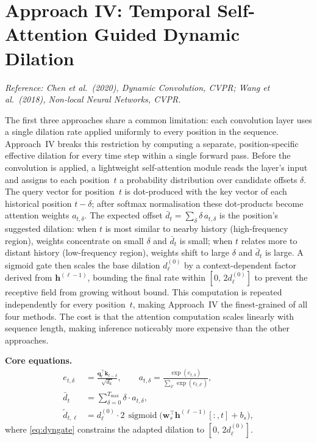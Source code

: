 \documentclass[12pt,a4paper]{article}
\DeclareMathOperator{\sigmoid}{sigmoid}
\newcommand{\hv}{\mathbf{h}}
\begin{document}
\section{Approach IV: Temporal Self-Attention Guided Dynamic Dilation}

\noindent\textit{Reference: Chen et al.\ (2020), Dynamic Convolution, CVPR;
Wang et al.\ (2018), Non-local Neural Networks, CVPR.}

\medskip

The first three approaches share a common limitation: each convolution layer
uses a single dilation rate applied uniformly to every position in the sequence.
Approach~IV breaks this restriction by computing a separate, position-specific
effective dilation for every time step within a single forward pass. Before the
convolution is applied, a lightweight self-attention module reads the layer's
input and assigns to each position~$t$ a probability distribution over candidate
offsets $\delta$. The query vector for position~$t$ is dot-produced with the
key vector of each historical position $t{-}\delta$; after softmax normalisation
these dot-products become attention weights $a_{t,\delta}$. The expected offset
$\bar{d}_t = \sum_\delta \delta\,a_{t,\delta}$ is the position's suggested
dilation: when $t$ is most similar to nearby history (high-frequency region),
weights concentrate on small $\delta$ and $\bar{d}_t$ is small; when $t$
relates more to distant history (low-frequency region), weights shift to large
$\delta$ and $\bar{d}_t$ is large. A sigmoid gate then scales the base dilation
$d_\ell^{(0)}$ by a context-dependent factor derived from $\hv^{(\ell-1)}$,
bounding the final rate within $[0,\,2d_\ell^{(0)}]$ to prevent the receptive
field from growing without bound. This computation is repeated independently
for every position~$t$, making Approach~IV the finest-grained of all four
methods. The cost is that the attention computation scales linearly with
sequence length, making inference noticeably more expensive than the other
approaches.

\medskip

\noindent\textbf{Core equations.}
\begin{align}
  e_{t,\delta}
    &= \frac{\mathbf{q}_t^{\top}\mathbf{k}_{t-\delta}}{\sqrt{d_k}},
    \qquad
    a_{t,\delta}
    = \frac{\exp(e_{t,\delta})}{\sum_{\delta'}\exp(e_{t,\delta'})},
    \label{eq:attn}\\
  \bar{d}_t
    &= \sum_{\delta=0}^{T_{\max}} \delta\cdot a_{t,\delta},
    \label{eq:effd}\\
  \tilde{d}_{t,\ell}
    &= d_\ell^{(0)}\cdot 2\,\sigmoid\!\bigl(\mathbf{w}_s^{\top}
       \hv^{(\ell-1)}[:,t]+b_s\bigr),
    \label{eq:dyngate}
\end{align}
where \cref{eq:dyngate} constrains the adapted dilation to
$[0,\,2d_\ell^{(0)}]$.
\end{document}
